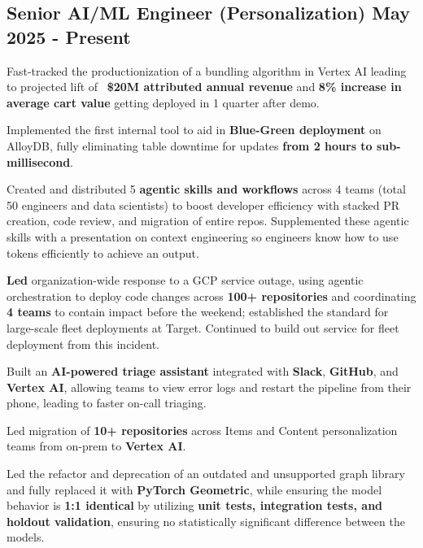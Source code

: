 \subsection{{Senior AI/ML Engineer (Personalization) \hfill May 2025 - Present}}  
\begin{zitemize}
\item Fast-tracked the productionization of a bundling algorithm in Vertex AI leading to projected lift of ~\textbf{\$20M attributed annual revenue} and \textbf{8\% increase in average cart value} getting deployed in 1 quarter after demo.    
\item Implemented the first internal tool to aid in \textbf{Blue-Green deployment} on AlloyDB, fully eliminating table downtime for updates \textbf{from 2 hours to sub-millisecond}. 
\item Created and distributed 5 \textbf{agentic skills and workflows} across 4 teams (total 50 engineers and data scientists) to boost developer efficiency with stacked PR creation, code review, and migration of entire repos. Supplemented these agentic skills with a presentation on context engineering so engineers know how to use tokens efficiently to achieve an output.
\item \textbf{Led} organization-wide response to a GCP service outage, using agentic orchestration to deploy code changes across \textbf{100+ repositories} and coordinating \textbf{4 teams} to contain impact before the weekend; established the standard for large-scale fleet deployments at Target. Continued to build out service for fleet deployment from this incident.
\item Built an \textbf{AI-powered triage assistant} integrated with \textbf{Slack}, \textbf{GitHub}, and \textbf{Vertex AI}, allowing teams to view error logs and restart the pipeline from their phone, leading to faster on-call triaging. 
\item Led migration of \textbf{10+ repositories} across Items and Content personalization teams from on-prem to \textbf{Vertex AI}.
\item Led the refactor and deprecation of an outdated and unsupported graph library and fully replaced it with \textbf{PyTorch Geometric}, while ensuring the model behavior is \textbf{1:1 identical} by utilizing \textbf{unit tests, integration tests, and holdout validation}, ensuring no statistically significant difference between the models. 
\end{zitemize}

